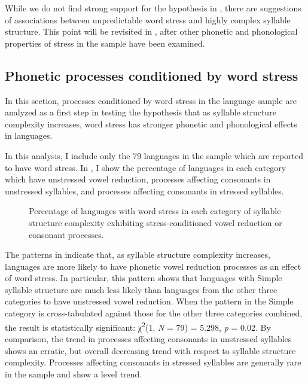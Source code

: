   While we do not find strong support for the hypothesis in , there are suggestions of associations between unpredictable word stress and highly complex syllable structure. This point will be revisited in , after other phonetic and phonological properties of stress in the sample have been examined.

\subsection{Phonetic processes conditioned by word stress}\label{sec:5.4.3}

  In this section, processes conditioned by word stress in the language sample are analyzed as a first step in testing the hypothesis that as syllable structure complexity increases, word stress has stronger phonetic and phonological effects in languages.

  In this analysis, I include only the 79 languages in the sample which are reported to have word stress. In , I show the percentage of languages in each category which have unstressed vowel reduction, processes affecting consonants in unstressed syllables, and processes affecting consonants in stressed syllables.

\begin{figure}
\caption{\label{fig:5.2} Percentage of languages with word stress in each category of syllable structure complexity exhibiting stress-conditioned vowel reduction or consonant processes.}
\end{figure}

  The patterns in  indicate that, as syllable structure complexity increases, languages are more likely to have phonetic vowel reduction processes as an effect of word stress. In particular, this pattern shows that languages with Simple syllable structure are much less likely than languages from the other three categories to have unstressed vowel reduction. When the pattern in the Simple category is cross-tabulated against those for the other three categories combined, the result is statistically significant: χ\textsuperscript{2}(1, \textit{N} = 79) = 5.298, \textit{p} = 0.02. By comparison, the trend in processes affecting consonants in unstressed syllables shows an erratic, but overall decreasing trend with respect to syllable structure complexity. Processes affecting consonants in stressed syllables are generally rare in the sample and show a level trend. 

